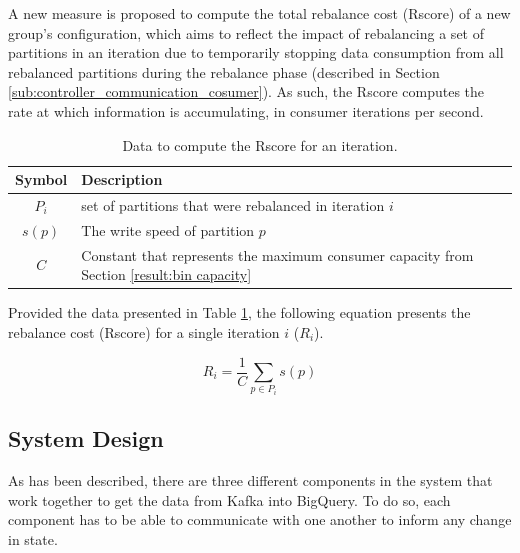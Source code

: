 A new measure is proposed to compute the total rebalance cost (Rscore) of a new
group's configuration, which aims to reflect the impact of rebalancing a set of
partitions in an iteration due to temporarily stopping data consumption from
all rebalanced partitions during the rebalance phase (described
in Section \ref{sub:controller_communication_cosumer}). As such, the Rscore
computes the rate at which information is accumulating, in consumer iterations
per second.

\begin{table}[H] 
\centering 
\caption{Data to compute the Rscore for an iteration.} 
\label{tab:rscore_data}
    \begin{tabular}{ |c|l| } 
        \hline 
        \textbf{Symbol} & \textbf{Description} \\ 
        \hline 
        $P_i$ & set of partitions that were rebalanced in iteration $i$ \\ 
        $s(p)$ & The write speed of partition $p$ \\ 
        $C$ &  Constant that represents the maximum consumer capacity from
            Section \ref{result:bin capacity}\\ 
        \hline 
    \end{tabular} 
\end{table}

Provided the data presented in Table \ref{tab:rscore_data}, the following
equation presents the rebalance cost (Rscore) for a single iteration $i$ ($R_i$).

\begin{equation} 
    R_i = \frac{1}{C}\sum_{p \in P_i} s(p) 
\end{equation}


\subsection{System Design}

As has been described, there are three different components in the system that
work together to get the data from Kafka into BigQuery. To do so, each component
has to be able to communicate with one another to inform any change in state.

